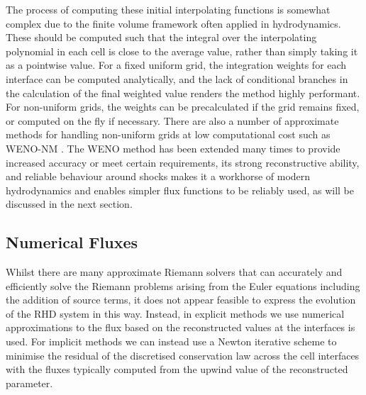 The process of computing these initial interpolating functions is somewhat complex due to the finite volume framework often applied in hydrodynamics.
These should be computed such that the integral over the interpolating polynomial in each cell is close to the average value, rather than simply taking it as a pointwise value.
For a fixed uniform grid, the integration weights for each interface can be computed analytically, and the lack of conditional branches in the calculation of the final weighted value renders the method highly performant.
For non-uniform grids, the weights can be precalculated if the grid remains fixed, or computed on the fly if necessary.
There are also a number of approximate methods for handling non-uniform grids at low computational cost such as WENO-NM \citep{Huang2018}.
The WENO method has been extended many times to provide increased accuracy or meet certain requirements, its strong reconstructive ability, and reliable behaviour around shocks makes it a workhorse of modern hydrodynamics and enables simpler flux functions to be reliably used, as will be discussed in the next section.


\subsection{Numerical Fluxes}

Whilst there are many approximate Riemann solvers that can accurately and efficiently solve the Riemann problems arising from the Euler equations including the addition of source terms, it does not appear feasible to express the evolution of the RHD system in this way.
Instead, in explicit methods we use numerical approximations to the flux based on the reconstructed values at the interfaces is used.
For implicit methods we can instead use a Newton iterative scheme to minimise the residual of the discretised conservation law across the cell interfaces with the fluxes typically computed from the upwind value of the reconstructed parameter.

